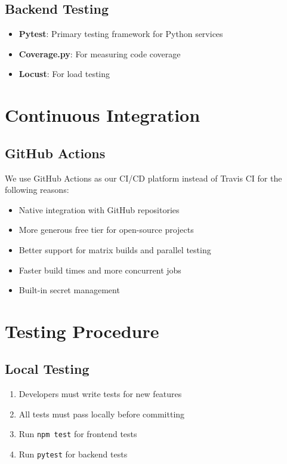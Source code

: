 \documentclass[12pt]{article}
\begin{document}
\subsection{Backend Testing}
\begin{itemize}
    \item \textbf{Pytest}: Primary testing framework for Python services
    \item \textbf{Coverage.py}: For measuring code coverage
    \item \textbf{Locust}: For load testing
\end{itemize}

\section{Continuous Integration}

\subsection{GitHub Actions}
We use GitHub Actions as our CI/CD platform instead of Travis CI for the following reasons:
\begin{itemize}
    \item Native integration with GitHub repositories
    \item More generous free tier for open-source projects
    \item Better support for matrix builds and parallel testing
    \item Faster build times and more concurrent jobs
    \item Built-in secret management
\end{itemize}

\section{Testing Procedure}

\subsection{Local Testing}
\begin{enumerate}
    \item Developers must write tests for new features
    \item All tests must pass locally before committing
    \item Run \texttt{npm test} for frontend tests
    \item Run \texttt{pytest} for backend tests
\end{enumerate}
\end{document}
